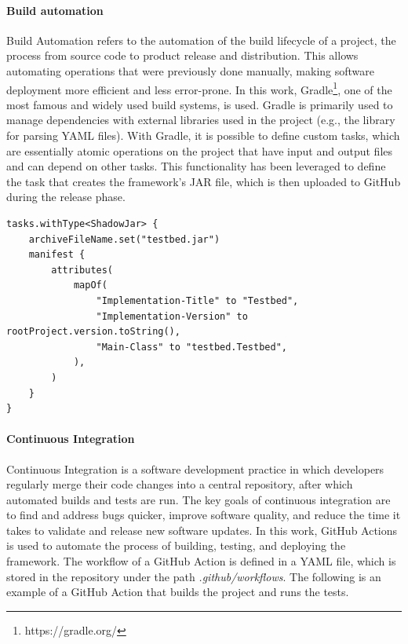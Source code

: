 \documentclass[12pt,a4paper,openright,twoside]{book}
\begin{document}
\paragraph*{Build automation}
Build Automation refers to the automation of the build lifecycle of a project, the process from source code to product release and distribution. 
This allows automating operations that were previously done manually, making software deployment more efficient and less error-prone.
In this work, Gradle\footnote{https://gradle.org/}, one of the most famous and widely used build systems, is used. 
Gradle is primarily used to manage dependencies with external libraries used in the project (e.g., the library for parsing YAML files).
With Gradle, it is possible to define custom tasks, which are essentially atomic operations on the project that have input and output files and can depend on other tasks. 
This functionality has been leveraged to define the task that creates the framework's JAR file, which is then uploaded to GitHub during the release phase.

\begin{lstlisting}[style=my-kotlin, language=my-kotlin, caption={Custom task to generate the JAR file}]
  tasks.withType<ShadowJar> {
    archiveFileName.set("testbed.jar")
    manifest {
        attributes(
            mapOf(
                "Implementation-Title" to "Testbed",
                "Implementation-Version" to rootProject.version.toString(),
                "Main-Class" to "testbed.Testbed",
            ),
        )
    }
}
\end{lstlisting}

\paragraph*{Continuous Integration}
Continuous Integration is a software development practice in which developers regularly merge their code changes into a central repository, after which automated builds and tests are run.
The key goals of continuous integration are to find and address bugs quicker, improve software quality, and reduce the time it takes to validate and release new software updates.
In this work, GitHub Actions is used to automate the process of building, testing, and deploying the framework.
The workflow of a GitHub Action is defined in a YAML file, which is stored in the repository under the path \textit{.github/workflows}.
The following is an example of a GitHub Action that builds the project and runs the tests.
\end{document}
